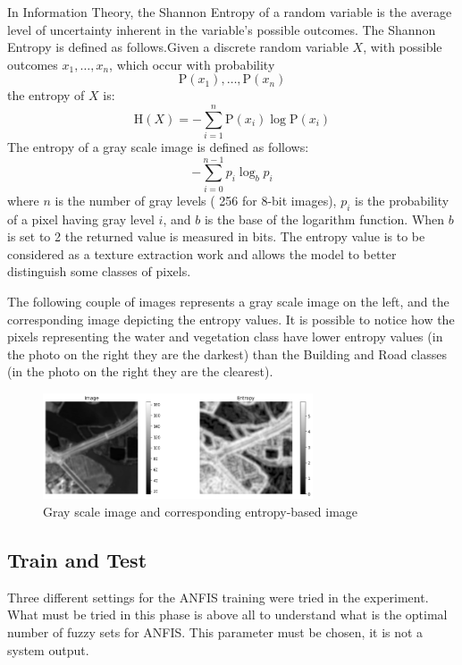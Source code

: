 \documentclass[10pt,twocolumn,letterpaper]{article}
\begin{document}
In Information Theory, the Shannon Entropy of a random variable is the average level of uncertainty  inherent in the variable's possible outcomes. The Shannon Entropy is defined as follows.Given a discrete random variable $X$, with possible outcomes $ x_{1}, \ldots, x_{n}$, which occur with probability $$\mathrm{P}\left(x_{1}\right), \ldots,\mathrm{P}\left(x_{n}\right)$$the entropy of $X$ is:
$$
\mathrm{H}(X)=-\sum_{i=1}^{n} \mathrm{P}\left(x_{i}\right) \log \mathrm{P}\left(x_{i}\right)
$$
The entropy of a gray scale image is defined as follows:
$$
-\sum_{i=0}^{n-1} p_{i} \log _{b} p_{i}
$$
where $n$ is the number of gray levels ( 256 for 8-bit images), $p_{i}$ is the probability of a pixel having gray level $i$, and $b$ is the base of the logarithm function. When $b$ is set to 2 the returned value is measured in bits.
The entropy value is to be considered as a texture extraction work and allows the model to better distinguish some classes of pixels.

The following couple of images represents a gray scale image on the left, and the corresponding image depicting the entropy values. It is possible to notice how the pixels representing the water and vegetation class have lower entropy values (in the photo on the right they are the darkest) than the Building and Road classes (in the photo on the right they are the clearest). 

\begin{figure}[h]
\includegraphics[width=8cm]{images/entropy.png}
\caption{Gray scale image and corresponding entropy-based image}
\end{figure}

\subsection{Train and Test}

Three different settings for the ANFIS training were tried in the experiment. What must be tried in this phase is above all to understand what is the optimal number of fuzzy sets for ANFIS. This parameter must be chosen, it is not a system output.
\end{document}

